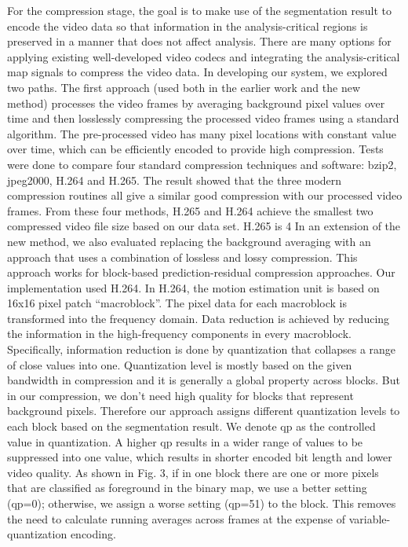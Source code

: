 For the compression stage, the goal is to make use of the segmentation result to encode the video data so that information in the analysis-critical regions is preserved in a manner that does not affect analysis. There are many options for applying existing well-developed video codecs and integrating the analysis-critical map signals to compress the video data. In developing our system, we explored two paths. The first approach (used both in the earlier work and the new method) processes the video frames by averaging background pixel values over time and then losslessly compressing the processed video frames using a standard algorithm. The pre-processed video has many pixel locations with constant value over time, which can be efficiently encoded to provide high compression. Tests were done to compare four standard compression techniques and software: bzip2, jpeg2000, H.264 and H.265. The result showed that the three modern compression routines all give a similar good compression with our processed video frames. From these four methods, H.265 and H.264 achieve the smallest two compressed video file size based on our data set. H.265 is 4%
In an extension of the new method, we also evaluated replacing the background averaging with an approach that uses a combination of lossless and lossy compression. This approach works for block-based prediction-residual compression approaches. Our implementation used H.264. In H.264, the motion estimation unit is based on 16x16 pixel patch “macroblock”. The pixel data for each macroblock is transformed into the frequency domain. Data reduction is achieved by reducing the information in the high-frequency components in every macroblock. Specifically, information reduction is done by quantization that collapses a range of close values into one. Quantization level is mostly based on the given bandwidth in compression and it is generally a global property across blocks. But in our compression, we don’t need high quality for blocks that represent background pixels. Therefore our approach assigns different quantization levels to each block based on the segmentation result. We denote qp as the controlled value in quantization. A higher qp results in a wider range of values to be suppressed into one value, which results in shorter encoded bit length and lower video quality. As shown in Fig. 3, if in one block there are one or more pixels that are classified as foreground in the binary map, we use a better setting (qp=0); otherwise, we assign a worse setting (qp=51) to the block. This removes the need to calculate running averages across frames at the expense of variable-quantization encoding.
